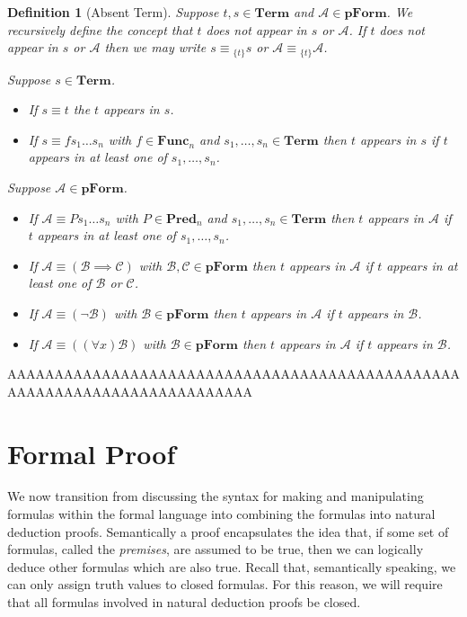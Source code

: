 \documentclass[12pt]{article}
\theoremstyle{break}
\newtheorem{definition}{Definition}[section]
\theoremstyle{break}
\theoremstyle{break}
\theoremstyle{break}
\newcommand{\mc}[1]{\mathcal{#1}}
\begin{document}
\begin{definition}[Absent Term]
Suppose $t, s\in\textbf{Term}$ and $\mc{A}\in\textbf{pForm}$.
We recursively define the concept that $t$ does not appear in $s$ or $\mc{A}$.
If $t$ does not appear in $s$ or $\mc{A}$ then we may write $s\equiv {_{\{t\}}s}$ or $\mc{A}\equiv {_{\{t\}}\mc{A}}$.

Suppose $s\in\textbf{Term}$.
\begin{itemize}
\item{If $s\equiv t$ the $t$ appears in $s$.}
\item{If $s\equiv f s_1\ldots s_n$ with $f\in\textbf{Func}_n$ and $s_1,\ldots,s_n\in\textbf{Term}$ then $t$ appears in $s$ if $t$ appears in at least one of $s_1,\ldots, s_n$.}
\end{itemize}

Suppose $\mc{A}\in\textbf{pForm}$.
\begin{itemize}
\item{If $\mc{A} \equiv Ps_1\ldots s_n$ with $P\in\textbf{Pred}_n$ and $s_1,\ldots, s_n\in\textbf{Term}$ then $t$ appears in $\mc{A}$ if $t$ appears in at least one of $s_1,\ldots, s_n$.}
\item{If $\mc{A} \equiv (\mc{B}\implies \mc{C})$ with $\mc{B}, \mc{C}\in\textbf{pForm}$ then $t$ appears in $\mc{A}$ if $t$ appears in at least one of $\mc{B}$ or $\mc{C}$.}
\item{If $\mc{A} \equiv (\lnot \mc{B})$ with $\mc{B}\in\textbf{pForm}$ then $t$ appears in $\mc{A}$ if $t$ appears in $\mc{B}$.}
\item{If $\mc{A} \equiv ((\forall x) \mc{B})$ with $\mc{B}\in\textbf{pForm}$ then $t$ appears in $\mc{A}$ if $t$ appears in $\mc{B}$.}
\end{itemize}

\end{definition}


AAAAAAAAAAAAAAAAAAAAAAAAAAAAAAAAAAAAAAAAAAAAAAAAAAAAAAAAAAAAAAAAAAAAAAAAAA

\section{Formal Proof}

We now transition from discussing the syntax for making and manipulating formulas within the formal language into combining the formulas into natural deduction proofs.
Semantically a proof encapsulates the idea that, if some set of formulas, called the \textit{premises}, are assumed to be true, then we can logically deduce other formulas which are also true.
Recall that, semantically speaking, we can only assign truth values to closed formulas.
For this reason, we will require that all formulas involved in natural deduction proofs be closed.
\end{document}

